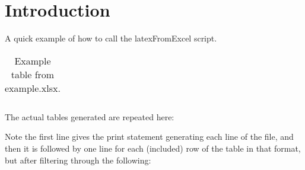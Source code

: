 \documentclass{article}
\begin{document}
\section{Introduction}

A quick example of how to call the latexFromExcel script. 

\begin{table*}[h]
  \centering
  {\small
    \begin{tabular}{r|ll}
      
      \hline
       
    \end{tabular} 
  }
  \caption{Example table from example.xlsx.}
  \label{tab:attributes}
\end{table*}

\noindent The actual tables generated are repeated here:



\noindent Note the first line gives the print statement generating each line of
the file, and then it is followed by one line for each (included) row
of the table in that format, but after filtering through the
following:


\end{document}
